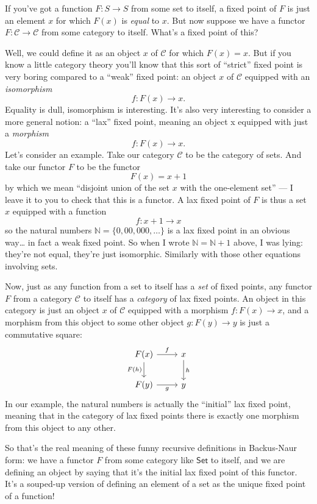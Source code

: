 \documentclass{article}
\begin{document}
If you've got a function \(F\colon S\to S\) from some set to itself, a
fixed point of \(F\) is just an element \(x\) for which \(F(x)\) is
\emph{equal} to \(x\). But now suppose we have a functor
\(F\colon \mathcal{C}\to\mathcal{C}\) from some category to itself.
What's a fixed point of this?

Well, we could define it as an object \(x\) of \(\mathcal{C}\) for which
\(F(x) = x\). But if you know a little category theory you'll know that
this sort of ``strict'' fixed point is very boring compared to a
``weak'' fixed point: an object \(x\) of \(\mathcal{C}\) equipped with
an \emph{isomorphism} \[f\colon F(x)\to x.\] Equality is dull,
isomorphism is interesting. It's also very interesting to consider a
more general notion: a ``lax'' fixed point, meaning an object x equipped
with just a \emph{morphism} \[f\colon F(x)\to x.\] Let's consider an
example. Take our category \(\mathcal{C}\) to be the category of sets.
And take our functor \(F\) to be the functor \[F(x) = x + 1\] by which
we mean ``disjoint union of the set \(x\) with the one-element set'' ---
I leave it to you to check that this is a functor. A lax fixed point of
\(F\) is thus a set \(x\) equipped with a function
\[f\colon x + 1\to x\] so the natural numbers
\(\mathbb{N} = \{0,00,000,\ldots\}\) is a lax fixed point in an obvious
way\ldots{} in fact a weak fixed point. So when I wrote
\(\mathbb{N} = \mathbb{N} + 1\) above, I was lying: they're not equal,
they're just isomorphic. Similarly with those other equations involving
sets.

Now, just as any function from a set to itself has a \emph{set} of fixed
points, any functor \(F\) from a category \(\mathcal{C}\) to itself has
a \emph{category} of lax fixed points. An object in this category is
just an object \(x\) of \(\mathcal{C}\) equipped with a morphism
\(f\colon F(x)\to x\), and a morphism from this object to some other
object \(g\colon F(y)\to y\) is just a commutative square: \[
  \begin{tikzcd}
    F(x) \rar["f"] \dar[swap,"F(h)"]
    & x \dar["h"]
  \\F(y) \rar[swap,"g"]
    & y
  \end{tikzcd}
\] In our example, the natural numbers is actually the ``initial'' lax
fixed point, meaning that in the category of lax fixed points there is
exactly one morphism from this object to any other.

So that's the real meaning of these funny recursive definitions in
Backus-Naur form: we have a functor \(F\) from some category like
\(\mathsf{Set}\) to itself, and we are defining an object by saying that
it's the initial lax fixed point of this functor. It's a souped-up
version of defining an element of a set as the unique fixed point of a
function!
\end{document}

